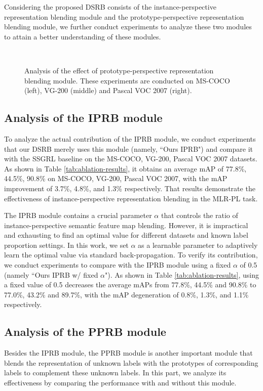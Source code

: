 \documentclass[lettersize,journal]{IEEEtran}
\begin{document}
Considering the proposed DSRB consists of the instance-perspective representation blending module and the prototype-perspective representation blending module, we further conduct experiments to analyze these two modules to attain a better understanding of these modules.

\begin{figure*}[!t] 
  \centering    
{}~     
~
~
  \caption{Analysis of the effect of prototype-perspective representation blending module. These experiments are conducted on MS-COCO (left), VG-200 (middle) and Pascal VOC 2007 (right).}     
  \label{fig:loss-result}     
\end{figure*}

\subsection{Analysis of the IPRB module}
To analyze the actual contribution of the IPRB module, we conduct experiments that our DSRB merely uses this module (namely, ``Ours IPRB") and compare it with the SSGRL baseline on the MS-COCO, VG-200, Pascal VOC 2007 datasets. As shown in Table \ref{tab:ablation-results}, it obtains an average mAP of 77.8\%, 44.5\%, 90.8\% on MS-COCO, VG-200, Pascal VOC 2007, with the mAP improvement of 3.7\%, 4.8\%, and 1.3\% respectively. That results demonstrate the effectiveness of instance-perspective representation blending in the MLR-PL task.

The IPRB module contains a crucial parameter $\alpha$ that controls the ratio of instance-perspective semantic feature map blending. However, it is impractical and exhausting to find an optimal value for different datasets and known label proportion settings. In this work, we set $\alpha$ as a learnable parameter to adaptively learn the optimal value via standard back-propagation. To verify its contribution, we conduct experiments to compare with the IPRB module using a fixed $\alpha$ of 0.5 (namely ``Ours IPRB w/ fixed $\alpha$"). As shown in Table \ref{tab:ablation-results}, using a fixed value of 0.5 decreases the average mAPs from 77.8\%, 44.5\% and 90.8\% to 77.0\%, 43.2\% and 89.7\%, with the mAP degeneration of 0.8\%, 1.3\%, and 1.1\% respectively. 

\subsection{Analysis of the PPRB module}
Besides the IPRB module, the PPRB module is another important module that blends the representation of unknown labels with the prototypes of corresponding labels to complement these unknown labels. In this part, we analyze its effectiveness by comparing the performance with and without this module. 
\end{document}
